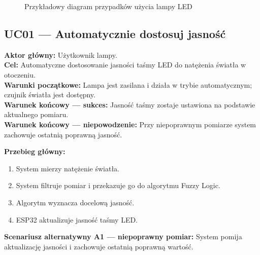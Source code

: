 \begin{figure}[htbp]
\centering
{}
\caption{Przykładowy diagram przypadków użycia lampy LED}
\label{fig:use-case-lamp}
\end{figure}
\subsection*{UC01 — Automatycznie dostosuj jasność}
\textbf{Aktor główny:} Użytkownik lampy.\\
\textbf{Cel:} Automatyczne dostosowanie jasności taśmy LED do natężenia światła w otoczeniu.\\
\textbf{Warunki początkowe:} Lampa jest zasilana i działa w trybie automatycznym; czujnik światła jest dostępny.\\
\textbf{Warunek końcowy — sukces:} Jasność taśmy zostaje ustawiona na podstawie aktualnego pomiaru.\\
\textbf{Warunek końcowy — niepowodzenie:} Przy niepoprawnym pomiarze system zachowuje ostatnią poprawną jasność.

\textbf{Przebieg główny:}
\begin{enumerate}
\item System mierzy natężenie światła.
\item System filtruje pomiar i przekazuje go do algorytmu Fuzzy Logic.
\item Algorytm wyznacza docelową jasność.
\item ESP32 aktualizuje jasność taśmy LED.
\end{enumerate}
\textbf{Scenariusz alternatywny A1 — niepoprawny pomiar:} System pomija aktualizację jasności i zachowuje ostatnią poprawną wartość.

